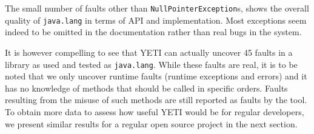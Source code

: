 The small number of faults other than \texttt{NullPointerException}s, shows the overall quality of \texttt{java.lang} in terms of API and implementation. Most exceptions seem indeed to be omitted in the documentation rather than real bugs in the system.

It is however compelling to see that YETI can actually uncover 45 faults in a library as used and tested as \texttt{java.lang}. 
While these faults are real, it is to be noted that we only uncover runtime faults (runtime exceptions and errors) and it has no knowledge of methods that should be called in specific orders.
Faults resulting from the misuse of such methods are still reported as faults by the tool.
To obtain more data to assess how useful YETI would be for regular developers, we present similar results for a regular open source project in the next section.



